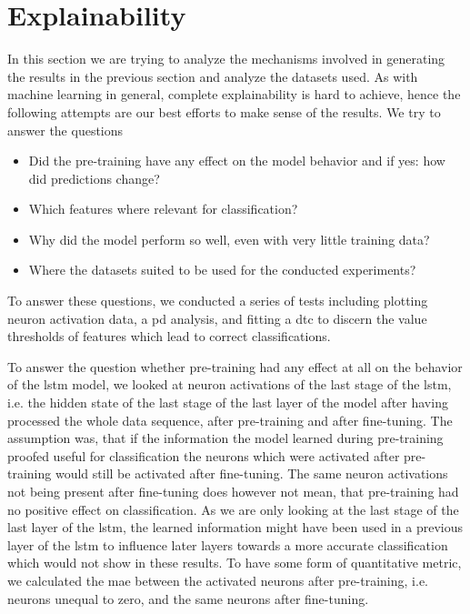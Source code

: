 


\section{Explainability} \label{sec:results:explainability}

In this section we are trying to analyze the mechanisms involved in generating the results in the previous section and analyze the datasets used. As with machine learning in general, complete explainability is hard to achieve, hence the following attempts are our best efforts to make sense of the results. We try to answer the questions

\begin{itemize}
	\item Did the pre-training have any effect on the model behavior and if yes: how did predictions change?
	\item Which features where relevant for classification? 
	\item Why did the model perform so well, even with very little training data?
	\item Where the datasets suited to be used for the conducted experiments?
\end{itemize}

To answer these questions, we conducted a series of tests including plotting neuron activation data, a \gls{pd} analysis, and fitting a \gls{dtc} to discern the value thresholds of features which lead to correct classifications. 

To answer the question whether pre-training had any effect at all on the behavior of the \gls{lstm} model, we looked at neuron activations of the last stage of the \gls{lstm}, i.e. the hidden state of the last stage of the last layer of the model after having processed the whole data sequence, after pre-training and after fine-tuning. The assumption was, that if the information the model learned during pre-training proofed useful for classification the neurons which were activated after pre-training would still be activated after fine-tuning. The same neuron activations not being present after fine-tuning does however not mean, that pre-training had no positive effect on classification. As we are only looking at the last stage of the last layer of the \gls{lstm}, the learned information might have been used in a previous layer of the \gls{lstm} to influence later layers towards a more accurate classification which would not show in these results. To have some form of quantitative metric, we calculated the \gls{mae} between the activated neurons after pre-training, i.e. neurons unequal to zero, and the same neurons after fine-tuning. 

